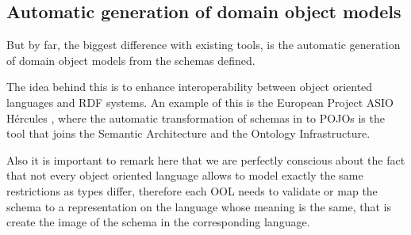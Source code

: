 \subsection{Automatic generation of domain object models}
But by far, the biggest difference with existing tools, is the automatic generation of domain object models from the schemas defined.

The idea behind this is to enhance interoperability between object oriented languages  and RDF systems. An example of this is the European Project ASIO Hércules , where the automatic transformation of schemas in to POJOs  is the tool that joins the Semantic Architecture and the Ontology Infrastructure.

Also it is important to remark here that we are perfectly conscious about the fact that not every object oriented language allows to model exactly the same restrictions as types differ, therefore each OOL needs to validate or map the schema to a representation on the language whose meaning is the same, that is create the image of the schema in the corresponding language.
